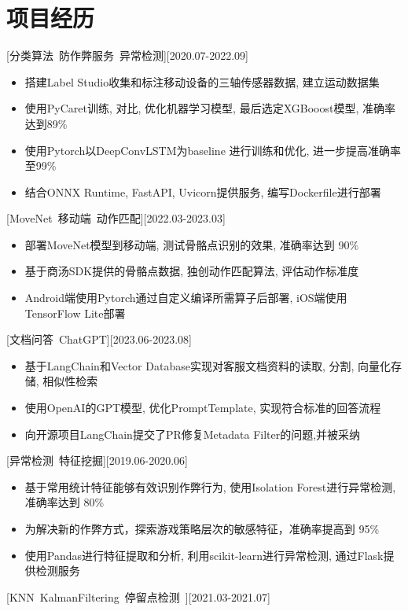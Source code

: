\documentclass{resume}
\begin{document}
\section{项目经历}
[分类算法~防作弊服务~异常检测][2020.07-2022.09]
\begin{itemize}
    \item 搭建Label Studio收集和标注移动设备的三轴传感器数据, 建立运动数据集
    \item 使用PyCaret训练, 对比, 优化机器学习模型, 最后选定XGBooost模型, 准确率达到89\%
    \item 使用Pytorch以DeepConvLSTM为baseline 进行训练和优化, 进一步提高准确率至99\%
    \item 结合ONNX Runtime, FastAPI, Uvicorn提供服务, 编写Dockerfile进行部署
\end{itemize}
[MoveNet~移动端~动作匹配][2022.03-2023.03]
\begin{itemize}
    \item 部署MoveNet模型到移动端, 测试骨骼点识别的效果, 准确率达到 90\%
    \item 基于商汤SDK提供的骨骼点数据, 独创动作匹配算法, 评估动作标准度
    \item Android端使用Pytorch通过自定义编译所需算子后部署, iOS端使用TensorFlow Lite部署
\end{itemize}
[文档问答~ChatGPT][2023.06-2023.08]
\begin{itemize}
    \item 基于LangChain和Vector Database实现对客服文档资料的读取, 分割, 向量化存储, 相似性检索
    \item 使用OpenAI的GPT模型, 优化PromptTemplate, 实现符合标准的回答流程
    \item 向开源项目LangChain提交了PR修复Metadata Filter的问题,并被采纳
\end{itemize}
[异常检测~特征挖掘][2019.06-2020.06]
\begin{itemize}
    \item 基于常用统计特征能够有效识别作弊行为, 使用Isolation Forest进行异常检测, 准确率达到 80\%
    \item 为解决新的作弊方式，探索游戏策略层次的敏感特征，准确率提高到 95\%
    \item 使用Pandas进行特征提取和分析, 利用scikit-learn进行异常检测, 通过Flask提供检测服务
\end{itemize}
[KNN~KalmanFiltering~停留点检测~][2021.03-2021.07]
\end{document}
